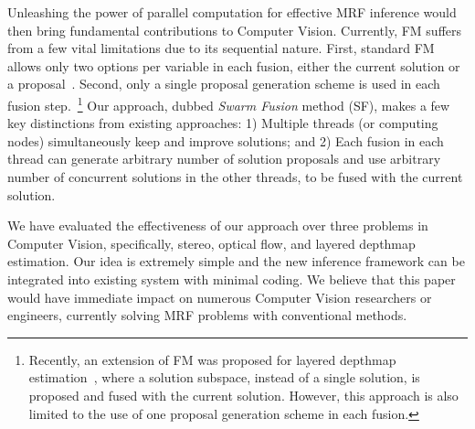 Unleashing the power of parallel computation for effective MRF inference
would then bring fundamental contributions to Computer
Vision. Currently, FM suffers from a few vital limitations due to its
sequential nature. First, standard FM allows only two options per
variable in each fusion, either the current solution or a
proposal~\cite{fusion_moves_for_markov_random_field_optimization}. Second,
only a single proposal generation scheme is used in each fusion
step.~\footnote{Recently, an extension of FM was proposed for layered
depthmap estimation~\cite{layered_depthmap}, where a solution subspace, instead
of a single solution, is proposed and fused with the current
solution. However, this approach is also limited to the use of one proposal
generation scheme in each fusion.}
%
Our approach, dubbed {\it Swarm Fusion} method (SF), makes a few key
distinctions from existing approaches: 1) Multiple threads (or computing
nodes) simultaneously keep and improve solutions; and 2) Each fusion in
each thread can generate arbitrary number of solution proposals and use
arbitrary number of concurrent solutions in the other threads, to be fused
with the current solution.
%


We have evaluated the effectiveness of our approach over three problems
in Computer Vision, specifically, stereo, optical flow, and layered
depthmap estimation.
%
%
%
Our idea is extremely simple and the new inference framework can be
integrated into existing system with minimal coding. We believe that
this paper would have immediate impact on numerous Computer Vision
researchers or engineers, currently solving MRF problems with
conventional methods.



%
%


